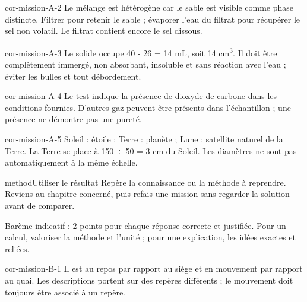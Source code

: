 \documentclass[12pt,twoside,openany]{book}
\begin{document}
\begin{blocLivre}{cor-mission-A-2}
Le mélange est hétérogène car le sable est visible comme phase distincte. Filtrer pour retenir le sable ; évaporer l’eau du filtrat pour récupérer le sel non volatil. Le filtrat contient encore le sel dissous.\par
{}
\end{blocLivre}
\begin{blocLivre}{cor-mission-A-3}
Le solide occupe 40 - 26 = 14 mL, soit 14 cm\textsuperscript{3}. Il doit être complètement immergé, non absorbant, insoluble et sans réaction avec l’eau ; éviter les bulles et tout débordement.\par
{}
\end{blocLivre}
\begin{blocLivre}{cor-mission-A-4}
Le test indique la présence de dioxyde de carbone dans les conditions fournies. D’autres gaz peuvent être présents dans l’échantillon ; une présence ne démontre pas une pureté.\par
{}
\end{blocLivre}
\begin{blocLivre}{cor-mission-A-5}
Soleil : étoile ; Terre : planète ; Lune : satellite naturel de la Terre. La Terre se place à 150 \(\div\) 50 = 3 cm du Soleil. Les diamètres ne sont pas automatiquement à la même échelle.\par
\begin{pcEncadre}{method}{Utiliser le résultat}
Repère la connaissance ou la méthode à reprendre. Reviens au chapitre concerné, puis refais une mission sans regarder la solution avant de comparer.\par
\end{pcEncadre}
\end{blocLivre}
\label{cor-bilan-B}
Barème indicatif : 2 points pour chaque réponse correcte et justifiée. Pour un calcul, valoriser la méthode et l’unité ; pour une explication, les idées exactes et reliées.\par
\begin{blocLivre}{cor-mission-B-1}
Il est au repos par rapport au siège et en mouvement par rapport au quai. Les descriptions portent sur des repères différents ; le mouvement doit toujours être associé à un repère.\par
{}
\end{blocLivre}
\end{document}
